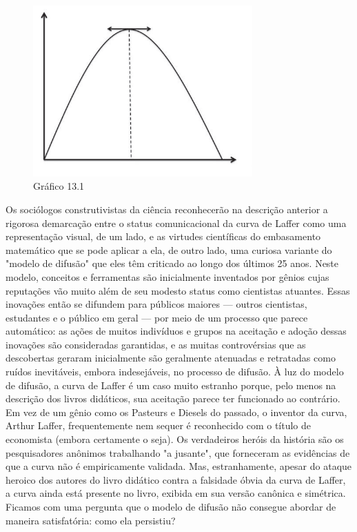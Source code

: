 \documentclass[12pt]{article}
\begin{document}
\begin{figure}[H]
    \centering
    \caption{Gráfico 13.1}
    \includegraphics[width=0.75\textwidth]{4º Período/História do Pensamento Econômico/Tradução HPE/Tradução Tópico 9.3/figura 1.png}
    \end{figure}

Os sociólogos construtivistas da ciência reconhecerão na descrição anterior a rigorosa demarcação entre o status comunicacional da curva de Laffer como uma representação visual, de um lado, e as virtudes científicas do embasamento matemático que se pode aplicar a ela, de outro lado, uma curiosa variante do "modelo de difusão" que eles têm criticado ao longo dos últimos 25 anos. Neste modelo, conceitos e ferramentas são inicialmente inventados por gênios cujas reputações vão muito além de seu modesto status como cientistas atuantes. Essas inovações então se difundem para públicos maiores — outros cientistas, estudantes e o público em geral — por meio de um processo que parece automático: as ações de muitos indivíduos e grupos na aceitação e adoção dessas inovações são consideradas garantidas, e as muitas controvérsias que as descobertas geraram inicialmente são geralmente atenuadas e retratadas como ruídos inevitáveis, embora indesejáveis, no processo de difusão. À luz do modelo de difusão, a curva de Laffer é um caso muito estranho porque, pelo menos na descrição dos livros didáticos, sua aceitação parece ter funcionado ao contrário. Em vez de um gênio como os Pasteurs e Diesels do passado, o inventor da curva, Arthur Laffer, frequentemente nem sequer é reconhecido com o título de economista (embora certamente o seja). Os verdadeiros heróis da história são os pesquisadores anônimos trabalhando "a jusante", que forneceram as evidências de que a curva não é empiricamente validada. Mas, estranhamente, apesar do ataque heroico dos autores do livro didático contra a falsidade óbvia da curva de Laffer, a curva ainda está presente no livro, exibida em sua versão canônica e simétrica. Ficamos com uma pergunta que o modelo de difusão não consegue abordar de maneira satisfatória: como ela persistiu?
\end{document}
